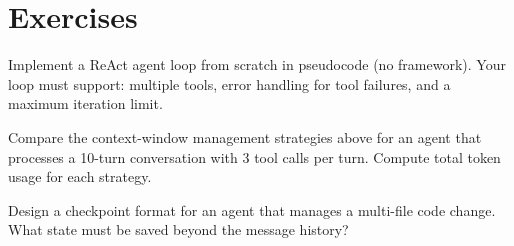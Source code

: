 \section{Exercises}

\begin{exercise}
	Implement a ReAct agent loop from scratch in pseudocode (no framework). Your loop must support: multiple tools, error handling for tool failures, and a maximum iteration limit.
\end{exercise}

\begin{exercise}
	Compare the context-window management strategies above for an agent that processes a 10-turn conversation with 3 tool calls per turn. Compute total token usage for each strategy.
\end{exercise}

\begin{exercise}
	Design a checkpoint format for an agent that manages a multi-file code change. What state must be saved beyond the message history?
\end{exercise}
